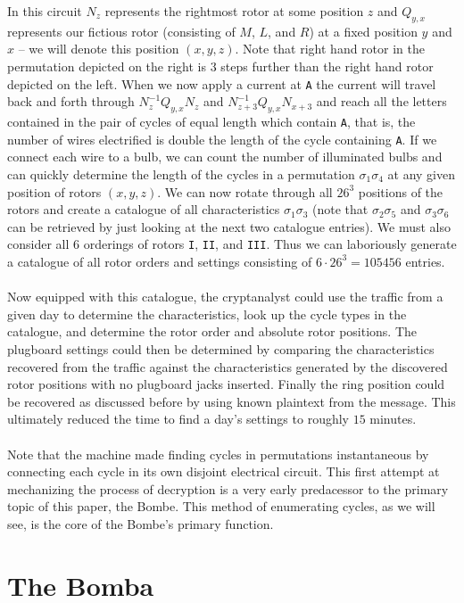 In this circuit $N_z$ represents the rightmost rotor at some position
$z$ and $Q_{y,x}$ represents our fictious rotor (consisting of $M$,
$L$, and $R$) at a fixed position $y$ and $x$ -- we will denote this position $(x,y,z)$. Note that right hand
rotor in the permutation depicted on the right is 3 steps further
than the right hand rotor depicted on the left. When we now apply a
current at \texttt{A} the current will travel back and forth through
$N^{-1}_zQ_{y,x}N_z$ and $N^{-1}_{z+3}Q_{y,x}N_{x+3}$ and reach all the letters contained
in the pair of cycles of equal length which contain \texttt{A}, that
is, the number of wires electrified is double the length of the cycle
containing \texttt{A}. If we connect each wire to a bulb, we can count the number of illuminated bulbs and can quickly determine the length of
the cycles in a permutation $\sigma_1\sigma_{4}$ at any given
position of rotors $(x,y,z)$. We can now rotate through all
$26^3$ positions of the rotors and create a catalogue of all
characteristics $\sigma_1\sigma_3$ (note that $\sigma_2\sigma_5$ and
$\sigma_3\sigma_6$ can be retrieved by just looking at the next two
catalogue entries). We must also consider all 6 orderings of rotors
\texttt{I}, \texttt{II}, and \texttt{III}. Thus we can laboriously
generate a catalogue of all rotor orders and settings consisting of
$6\cdot 26^3 = 105456$ entries.
\\\\Now equipped with this catalogue, the cryptanalyst could use the
traffic from a given day to determine the characteristics, look up
the cycle types in the catalogue, and determine the rotor order and
absolute rotor positions. The plugboard settings could then be
determined by comparing the characteristics recovered from the
traffic against the characteristics generated by the discovered rotor
positions with no plugboard jacks inserted. Finally the ring position
could be recovered as discussed before by using known plaintext from
the message. This ultimately reduced the time to find a day's
settings to roughly $15$ minutes.
\\\\Note that the machine made finding cycles in permutations
instantaneous by connecting each cycle in its own disjoint electrical
circuit. This first attempt at mechanizing the process of decryption
is a very early predacessor to the primary topic of this paper, the
Bombe. This method of enumerating cycles, as we will see, is the core
of the Bombe's primary function.
\section{The Bomba}

